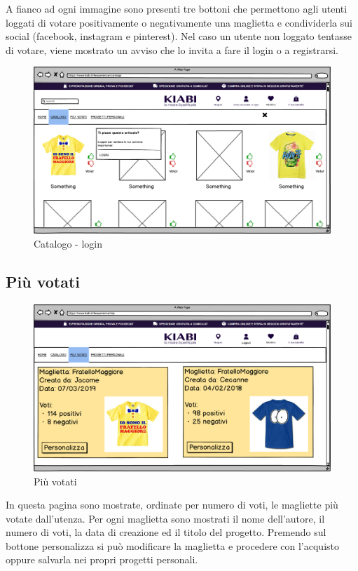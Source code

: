 \documentclass[12pt,italian,]{report}
\begin{document}
A fianco ad ogni immagine sono presenti tre bottoni che permettono agli
utenti loggati di votare positivamente o negativamente una maglietta e condividerla sui social (facebook, instagram e pinterest).
Nel caso un utente non loggato tentasse di votare, viene mostrato un
avviso che lo invita a fare il login o a registrarsi.

\begin{figure}[h]
\centering
\includegraphics{../balsamiq/balsamiq_finale/Catalogologin.png}
\caption{Catalogo - login}
\end{figure}

\hypertarget{piuxf9-votati}{%
\subsection{Più votati}\label{piuxf9-votati}}

\begin{figure}[h]
\centering
\includegraphics{../balsamiq/balsamiq_finale/MostRated.png}
\caption{Più votati}
\end{figure}

In questa pagina sono mostrate, ordinate per numero di voti, le
magliette più votate dall'utenza. Per ogni maglietta sono mostrati
il nome dell'autore, il numero di voti, la data di creazione ed il titolo del
progetto. Premendo sul bottone personalizza si può modificare la
maglietta e procedere con l'acquisto oppure salvarla nei propri progetti personali.
\end{document}

